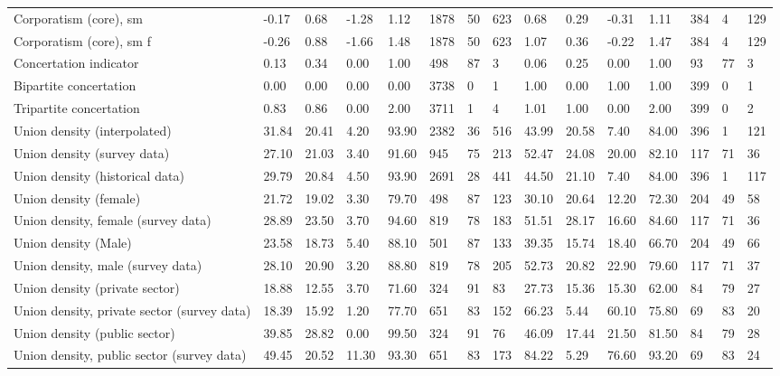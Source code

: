 \begin{longtable}{lllllllllllllll}
\addlinespace
Corporatism (core), sm & -0.17 & 0.68 & -1.28 & 1.12 & 1878 & 50 & 623 & 0.68 & 0.29 & -0.31 & 1.11 & 384 & 4 & 129\\
Corporatism (core), sm f & -0.26 & 0.88 & -1.66 & 1.48 & 1878 & 50 & 623 & 1.07 & 0.36 & -0.22 & 1.47 & 384 & 4 & 129\\
Concertation indicator & 0.13 & 0.34 & 0.00 & 1.00 & 498 & 87 & 3 & 0.06 & 0.25 & 0.00 & 1.00 & 93 & 77 & 3\\
Bipartite concertation & 0.00 & 0.00 & 0.00 & 0.00 & 3738 & 0 & 1 & 1.00 & 0.00 & 1.00 & 1.00 & 399 & 0 & 1\\
Tripartite concertation & 0.83 & 0.86 & 0.00 & 2.00 & 3711 & 1 & 4 & 1.01 & 1.00 & 0.00 & 2.00 & 399 & 0 & 2\\
\addlinespace
Union density (interpolated) & 31.84 & 20.41 & 4.20 & 93.90 & 2382 & 36 & 516 & 43.99 & 20.58 & 7.40 & 84.00 & 396 & 1 & 121\\
Union density (survey data) & 27.10 & 21.03 & 3.40 & 91.60 & 945 & 75 & 213 & 52.47 & 24.08 & 20.00 & 82.10 & 117 & 71 & 36\\
Union density (historical data) & 29.79 & 20.84 & 4.50 & 93.90 & 2691 & 28 & 441 & 44.50 & 21.10 & 7.40 & 84.00 & 396 & 1 & 117\\
Union density (female) & 21.72 & 19.02 & 3.30 & 79.70 & 498 & 87 & 123 & 30.10 & 20.64 & 12.20 & 72.30 & 204 & 49 & 58\\
Union density, female (survey data) & 28.89 & 23.50 & 3.70 & 94.60 & 819 & 78 & 183 & 51.51 & 28.17 & 16.60 & 84.60 & 117 & 71 & 36\\
\addlinespace
Union density (Male) & 23.58 & 18.73 & 5.40 & 88.10 & 501 & 87 & 133 & 39.35 & 15.74 & 18.40 & 66.70 & 204 & 49 & 66\\
Union density, male (survey data) & 28.10 & 20.90 & 3.20 & 88.80 & 819 & 78 & 205 & 52.73 & 20.82 & 22.90 & 79.60 & 117 & 71 & 37\\
Union density (private sector) & 18.88 & 12.55 & 3.70 & 71.60 & 324 & 91 & 83 & 27.73 & 15.36 & 15.30 & 62.00 & 84 & 79 & 27\\
Union density, private sector (survey data) & 18.39 & 15.92 & 1.20 & 77.70 & 651 & 83 & 152 & 66.23 & 5.44 & 60.10 & 75.80 & 69 & 83 & 20\\
Union density (public sector) & 39.85 & 28.82 & 0.00 & 99.50 & 324 & 91 & 76 & 46.09 & 17.44 & 21.50 & 81.50 & 84 & 79 & 28\\
\addlinespace
Union density, public sector (survey data) & 49.45 & 20.52 & 11.30 & 93.30 & 651 & 83 & 173 & 84.22 & 5.29 & 76.60 & 93.20 & 69 & 83 & 24\\

\end{longtable}
